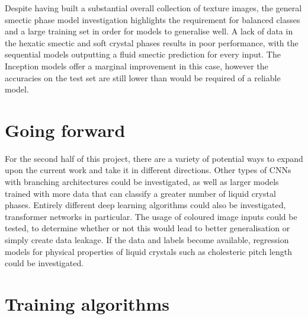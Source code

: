 \documentclass[12pt]{article}
\begin{document}
Despite having built a substantial overall collection of texture images, the general smectic phase model investigation highlights the requirement for balanced classes and a large training set in order for models to generalise well. A lack of data in the hexatic smectic and soft crystal phases results in poor performance, with the sequential models outputting a fluid smectic prediction for every input. The Inception models offer a marginal improvement in this case, however the accuracies on the test set are still lower than would be required of a reliable model.
\section{Going forward}
For the second half of this project, there are a variety of potential ways to expand upon the current work and take it in different directions. Other types of CNNs with branching architectures could be investigated, as well as larger models trained with more data that can classify a greater number of liquid crystal phases. Entirely different deep learning algorithms could also be investigated, transformer networks in particular. The usage of coloured image inputs could be tested, to determine whether or not this would lead to better generalisation or simply create data leakage. If the data and labels become available, regression models for physical properties of liquid crystals such as cholesteric pitch length could be investigated.



\appendix
\appendixpage
\section{Training algorithms}
\end{document}
